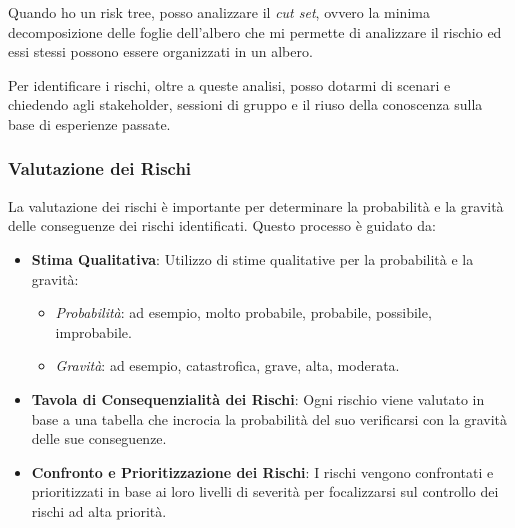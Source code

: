 Quando ho un risk tree, posso analizzare il \textit{cut set}, ovvero la minima decomposizione 
delle foglie dell'albero che mi permette di analizzare il rischio ed essi stessi possono 
essere organizzati in un albero.

Per identificare i rischi, oltre a queste analisi, posso dotarmi di scenari e chiedendo 
agli stakeholder, sessioni di gruppo e il riuso della conoscenza sulla base di esperienze 
passate.
\subsubsection{Valutazione dei Rischi}
\begin{figure}[H]
    \centering
\end{figure}
La valutazione dei rischi è importante per determinare la probabilità e la gravità
delle conseguenze dei rischi identificati. Questo processo è guidato da:

\begin{itemize}
    \item \textbf{Stima Qualitativa}: Utilizzo di stime qualitative per la probabilità
    e la gravità:
    \begin{itemize}
        \item \textit{Probabilità}: ad esempio, molto probabile, probabile, possibile,
        improbabile.
        \item \textit{Gravità}: ad esempio, catastrofica, grave, alta, moderata.
    \end{itemize}
    \item \textbf{Tavola di Consequenzialità dei Rischi}: Ogni rischio viene valutato
    in base a una tabella che incrocia la probabilità del suo verificarsi con la gravità
    delle sue conseguenze.
    \item \textbf{Confronto e Prioritizzazione dei Rischi}: I rischi vengono confrontati
    e prioritizzati in base ai loro livelli di severità per focalizzarsi sul controllo
    dei rischi ad alta priorità.
\end{itemize}

